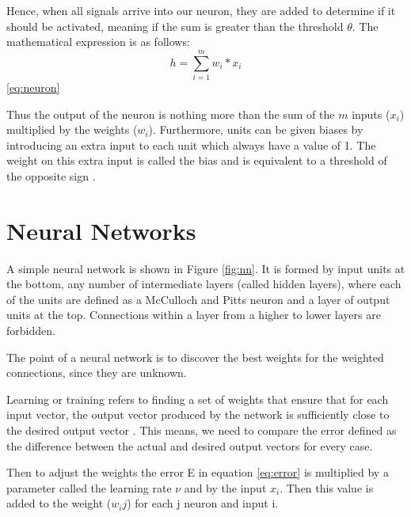 Hence, when all signals arrive into our neuron, they are added to determine if it should be activated, meaning if the sum is greater than the threshold $\theta$. The mathematical expression is as follows:\\
\begin{equation} \label{eq:neuron}
h=\sum_{i=1}^{m} w_i * x_i
\end{equation}\ref{eq:neuron}

Thus the output of the neuron is nothing more than the sum of the $m$ inputs ($x_i$) multiplied by the weights ($w_i$). Furthermore, units can be given biases by introducing an extra input to each unit which always have a value of 1. The weight on this extra input is called the bias and is equivalent to a threshold of the opposite sign \cite{polk2002cognitive}.


\section{Neural Networks}

A simple neural network is shown in Figure \ref{fig:nn}. It is formed by input units at the bottom, any number of intermediate layers (called hidden layers), where each of the units are  defined as a McCulloch and Pitts neuron and a layer of output units at the top. Connections within a layer from a higher to lower layers are forbidden. 

The point of a neural network is to discover the best weights for the weighted connections, since they are unknown. 

Learning or training refers to finding a set of weights that ensure that for each input vector, the output vector produced by the network is sufficiently close to the desired output vector \cite{polk2002cognitive}. This means, we need to compare the error defined as the difference between the actual and desired output vectors for every case.

Then to adjust the weights the error E in equation \ref{eq:error} is multiplied by a parameter called the learning rate $\nu$ and by the input $x_i$. Then this value is added to the weight ($w_ij$) for each j neuron and input i.

